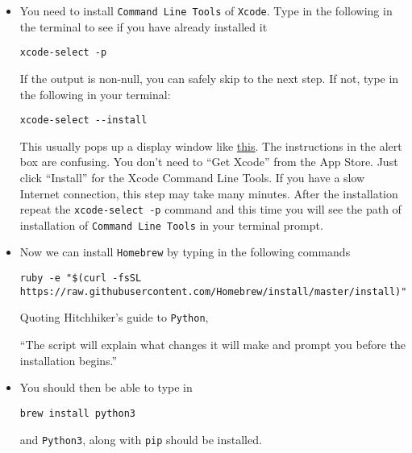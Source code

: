 \documentclass[11pt]{article}
\begin{document}
\begin{itemize}
\begin{itemize}
\begin{itemize}
\item You need to install \texttt{Command Line Tools} of \texttt{Xcode}. Type in the
following in the terminal to see if you have already installed it
\begin{verbatim}
xcode-select -p
\end{verbatim}
If the output is non-null, you can safely skip to the next step. If not,
type in the following in your terminal:
\begin{verbatim}
xcode-select --install
\end{verbatim}
This usually pops up a display window like \href{https://railsapps.github.io/images/installing-mavericks-popup.png}{this}. The instructions in the
alert box are confusing. You don’t need to ``Get Xcode'' from the App
Store. Just click ``Install'' for the Xcode Command Line Tools. If you have
a slow Internet connection, this step may take many minutes. After the
installation repeat the \texttt{xcode-select -p}  command and this time you will
see the path of installation of \texttt{Command Line Tools} in your terminal prompt.
\item Now we can install \texttt{Homebrew} by typing in the following commands
\begin{verbatim}
ruby -e "$(curl -fsSL https://raw.githubusercontent.com/Homebrew/install/master/install)"
\end{verbatim}
Quoting Hitchhiker's guide to \texttt{Python},

``The script will explain what changes it will make and prompt you before the installation begins.''

\item You should then be able to type in
\begin{verbatim}
brew install python3
\end{verbatim}
and \texttt{Python3}, along with \texttt{pip} should be installed.
\end{itemize}
\end{itemize}
\end{itemize}
\end{document}

